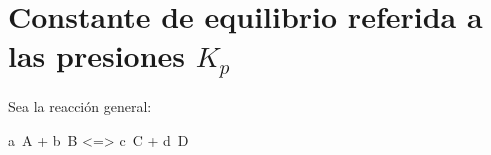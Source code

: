 

    \section{Constante de equilibrio referida a las presiones \texorpdfstring{\(K_p\)}{Kp}}\label{sec:constante-de-equilibrio-referida-a-las-presiones}

    \setcounter{ejemplo}{0}

    Sea la reacción general:

    \begin{reaction*}
        a\ A\gas{} + b\ B \gas{} <=> c\ C \gas{} + d\ D\gas{}
    \end{reaction*}


